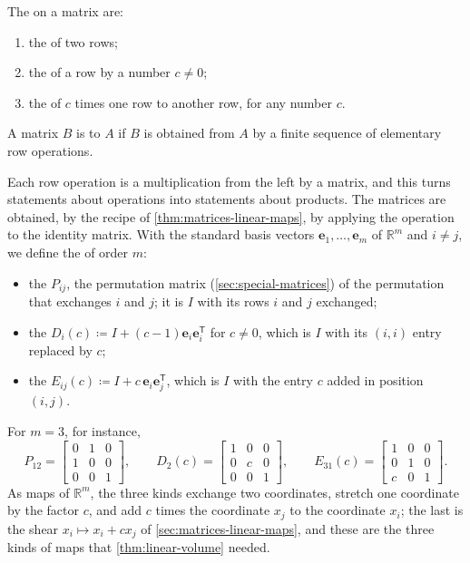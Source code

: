 \begin{definition}
\label{def:row-operations}
The  on a matrix are:
\begin{enumerate}
\item the  of two rows;
\item the  of a row by a number $c\ne0$;
\item the  of $c$ times one row to another row, for any number $c$.
\end{enumerate}
A matrix $B$ is  to $A$ if $B$ is obtained from $A$ by a finite sequence of elementary row operations.
\end{definition}

Each row operation is a multiplication from the left by a matrix, and this turns statements about operations into statements about products. The matrices are obtained, by the recipe of \cref{thm:matrices-linear-maps}, by applying the operation to the identity matrix. With the standard basis vectors $\mathbf e_1,\ldots,\mathbf e_m$ of $\mathbb R^m$ and $i\ne j$, we define the  of order $m$:
\begin{itemize}
\item the  $P_{ij}$, the permutation matrix (\cref{sec:special-matrices}) of the permutation that exchanges $i$ and $j$; it is $I$ with its rows $i$ and $j$ exchanged;
\item the  $D_i(c)\coloneqq I+(c-1)\mathbf e_i\mathbf e_i^{\mathsf T}$ for $c\ne0$, which is $I$ with its $(i,i)$ entry replaced by $c$;
\item the  $E_{ij}(c)\coloneqq I+c\,\mathbf e_i\mathbf e_j^{\mathsf T}$, which is $I$ with the entry $c$ added in position $(i,j)$.
\end{itemize}
For $m=3$, for instance,
\[
P_{12}=\begin{bmatrix}0&1&0\\1&0&0\\0&0&1\end{bmatrix},\qquad D_2(c)=\begin{bmatrix}1&0&0\\0&c&0\\0&0&1\end{bmatrix},\qquad E_{31}(c)=\begin{bmatrix}1&0&0\\0&1&0\\c&0&1\end{bmatrix}.
\]
As maps of $\mathbb R^m$, the three kinds exchange two coordinates, stretch one coordinate by the factor $c$, and add $c$ times the coordinate $x_j$ to the coordinate $x_i$; the last is the shear $x_i\mapsto x_i+cx_j$ of \cref{sec:matrices-linear-maps}, and these are the three kinds of maps that \cref{thm:linear-volume} needed.

